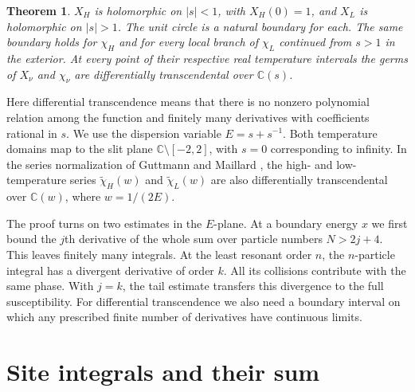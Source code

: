 \documentclass[11pt]{article}
\newtheorem*{theorem}{Theorem}
\newcommand{\C}{\mathbb C}
\begin{document}
\begin{theorem}
$X_H$ is holomorphic on $|s|<1$, with $X_H(0)=1$, and $X_L$ is
holomorphic on $|s|>1$. The unit circle is a natural boundary for
each. The same boundary holds for $\chi_H$ and for every local branch
of $\chi_L$ continued from $s>1$ in the exterior. At every point of
their respective real temperature intervals the germs of $X_\nu$ and
$\chi_\nu$ are differentially transcendental over $\C(s)$.
\end{theorem}

Here differential transcendence means that there is no nonzero
polynomial relation among the function and finitely many derivatives
with coefficients rational in $s$. We use the dispersion variable
$E=s+s^{-1}$. Both temperature domains map to the slit plane
$\C\setminus[-2,2]$, with $s=0$ corresponding to infinity. In the
series normalization of Guttmann and Maillard \cite[(4)--(5)]{GM},
the high- and low-temperature series $\widetilde\chi_H(w)$ and
$\widetilde\chi_L(w)$ are also differentially transcendental over
$\C(w)$, where $w=1/(2E)$.

The proof turns on two estimates in the $E$-plane. At a boundary
energy $x$ we first bound the $j$th derivative of the whole sum over
particle numbers $N>2j+4$. This leaves finitely many integrals. At the
least resonant order $n$, the $n$-particle integral has a divergent
derivative of order $k$. All its collisions contribute with the same
phase. With $j=k$, the tail estimate transfers this divergence to
the full susceptibility. For differential transcendence we also need a
boundary interval on which any prescribed finite number of derivatives
have continuous limits.

\section{Site integrals and their sum}
\end{document}
